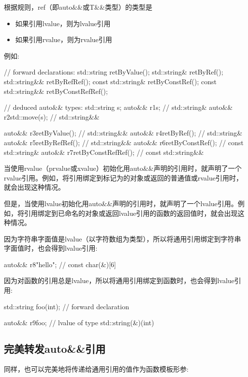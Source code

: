 根据规则，ref（即auto\&\&或T\&\&类型）的类型是

\begin{itemize}
	\item 如果引用lvalue，则为lvalue引用
	\item 如果引用rvalue，则为rvalue引用
\end{itemize}

例如:

\begin{cppcode}
// forward declarations:
std::string retByValue();
std::string& retByRef();
std::string&& retByRefRef();
const std::string& retByConstRef();
const std::string&& retByConstRefRef();

// deduced auto&& types:
std::string s;
auto&& r1{s}; // std::string&
auto&& r2{std::move(s)}; // std::string&&

auto&& r3{retByValue()}; // std::string&&
auto&& r4{retByRef()}; // std::string&
auto&& r5{retByRefRef()}; // std::string&&
auto&& r6{retByConstRef()}; // const std::string&
auto&& r7{retByConstRefRef()}; // const std::string&&
\end{cppcode}

当使用rvalue（prvalue或xvalue）初始化用auto\&\&声明的引用时，就声明了一个rvalue引用。例如，将引用绑定到标记为的对象或返回的普通值或rvalue引用时，就会出现这种情况。

但是，当使用lvalue初始化用auto\&\&声明的引用时，就声明了一个lvalue引用。例如，将引用绑定到已命名的对象或返回lvalue引用的函数的返回值时，就会出现这种情况。

因为字符串字面值是lvalue（以字符数组为类型），所以将通用引用绑定到字符串字面值时，也会得到lvalue引用:

\begin{cppcode}
auto&& r8{"hello"}; // const char(&)[6]
\end{cppcode}

因为对函数的引用总是lvalue，所以将通用引用绑定到函数时，也会得到lvalue引用:

\begin{cppcode}
std::string foo(int); // forward declaration

auto&& r9{foo}; // lvalue of type std::string(&)(int)
\end{cppcode}

\subsection{完美转发auto\&\&引用}

同样，也可以完美地将传递给通用引用的值作为函数模板形参:


